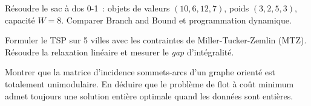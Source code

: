 \begin{exercice}
R\'esoudre le sac \`a dos 0-1~: objets de valeurs $(10, 6, 12, 7)$, poids
$(3, 2, 5, 3)$, capacit\'e $W = 8$. Comparer Branch and Bound et
programmation dynamique.
\end{exercice}

\begin{exercice}
Formuler le TSP sur 5 villes avec les contraintes de Miller-Tucker-Zemlin
(MTZ). R\'esoudre la relaxation lin\'eaire et mesurer le \emph{gap}
d'int\'egralit\'e.
\end{exercice}

\begin{exercice}
Montrer que la matrice d'incidence sommets-arcs d'un graphe orient\'e est
totalement unimodulaire. En d\'eduire que le probl\`eme de flot \`a co\^ut
minimum admet toujours une solution enti\`ere optimale quand les donn\'ees
sont enti\`eres.
\end{exercice}
